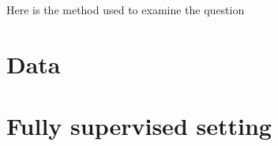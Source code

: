 Here is the method used to examine the question

\section{Data}

\section{Fully supervised setting}


